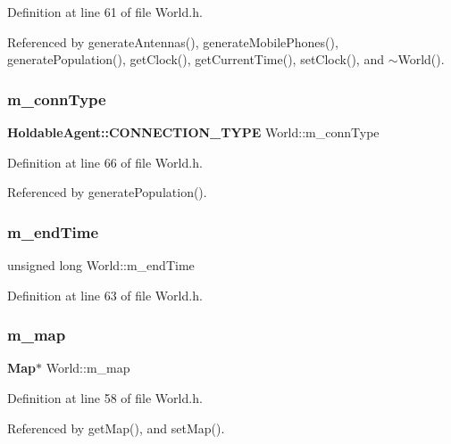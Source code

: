 Definition at line 61 of file World.\+h.



Referenced by generate\+Antennas(), generate\+Mobile\+Phones(), generate\+Population(), get\+Clock(), get\+Current\+Time(), set\+Clock(), and $\sim$\+World().

\mbox{\label{class_world_afeac65cddcd1e1c4fa14a17efa35be06}} 
\subsubsection{m\_connType}
{\footnotesize\ttfamily \textbf{ Holdable\+Agent\+::\+C\+O\+N\+N\+E\+C\+T\+I\+O\+N\+\_\+\+T\+Y\+PE} World\+::m\+\_\+conn\+Type\hspace{0.3cm}{\ttfamily [private]}}



Definition at line 66 of file World.\+h.



Referenced by generate\+Population().

\mbox{\label{class_world_ab6b8ad11e4031f3072a78f00a66e9ec5}} 
\subsubsection{m\_endTime}
{\footnotesize\ttfamily unsigned long World\+::m\+\_\+end\+Time\hspace{0.3cm}{\ttfamily [private]}}



Definition at line 63 of file World.\+h.

\mbox{\label{class_world_ae1e6f62c5b282e94ffdcaab58fcb3fb4}} 
\subsubsection{m\_map}
{\footnotesize\ttfamily \textbf{ Map}$\ast$ World\+::m\+\_\+map\hspace{0.3cm}{\ttfamily [private]}}



Definition at line 58 of file World.\+h.



Referenced by get\+Map(), and set\+Map().

\mbox{\label{class_world_a9fcf012ce7262edf5646f0720ffd7666}} 
